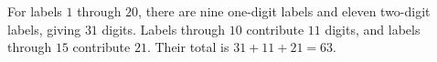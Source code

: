 For labels $1$ through $20$, there are nine one-digit labels and eleven two-digit labels, giving $31$ digits. Labels through $10$ contribute $11$ digits, and labels through $15$ contribute $21$. Their total is $31+11+21=\boxed{63}$.
